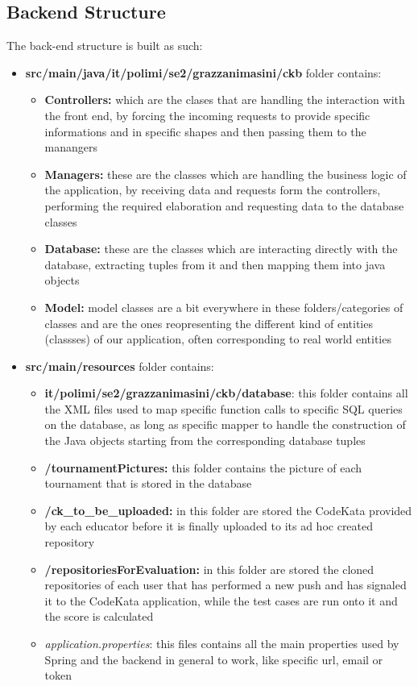\documentclass[table, 12pt]{article}
\begin{document}
\subsection{Backend Structure}
The back-end structure is built as such:
\begin{itemize}
    \item \textbf{src/main/java/it/polimi/se2/grazzanimasini/ckb} folder contains:
        \begin{itemize}
            \item \textbf{Controllers:} which are the clases that are handling the interaction with the front end, by forcing the incoming requests to provide specific informations and in specific shapes and then passing them to the manangers
            \item \textbf{Managers:} these are the classes which are handling the business logic of the application, by receiving data and requests form the controllers, performing the required elaboration and requesting data to the database classes
            \item \textbf{Database:} these are the classes which are interacting directly with the database, extracting tuples from it and then mapping them into java objects
            \item \textbf{Model:} model classes are a bit everywhere in these folders/categories of classes and are the ones reopresenting the different kind of entities (classses) of our application, often corresponding to real world entities
        \end{itemize}
    \item \textbf{src/main/resources} folder contains:
    \begin{itemize}
        \item \textbf{it/polimi/se2/grazzanimasini/ckb/database}: this folder contains all the XML files used to map specific function calls to specific SQL queries on the database, as long as specific mapper to handle the construction of the Java objects starting from the corresponding database tuples
        \item \textbf{/tournamentPictures:} this folder contains the picture of each tournament that is stored in the database
        \item \textbf{/ck\_to\_be\_uploaded:} in this folder are stored the CodeKata provided by each educator before it is finally uploaded to its ad hoc created repository
        \item \textbf{/repositoriesForEvaluation:} in this folder are stored the cloned repositories of each user that has performed a new push and has signaled it to the CodeKata application, while the test cases are run onto it and the score is calculated
        \item \textit{application.properties}: this files contains all the main properties used by Spring and the backend in general to work, like specific url, email or token
    \end{itemize}
\end{itemize}
\end{document}
